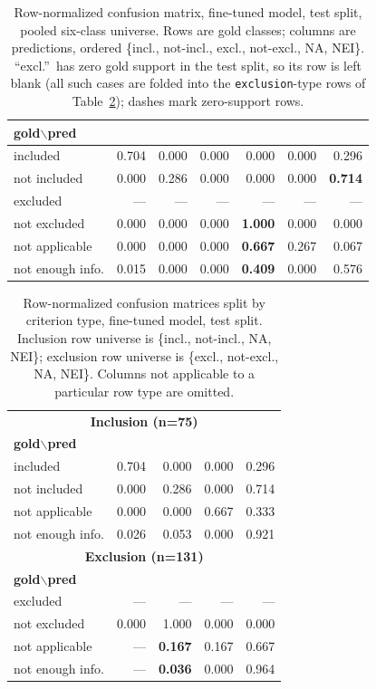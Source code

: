 \documentclass[conference]{IEEEtran}
\newcommand{\code}[1]{\texttt{\small #1}}
\newcommand{\rot}[1]{\rotatebox{60}{\footnotesize #1}}
\begin{document}
\begin{table}[t]
\caption{Row-normalized confusion matrix, fine-tuned model, test
split, pooled six-class universe. Rows are gold classes; columns
are predictions, ordered \{incl., not-incl., excl., not-excl.,
NA, NEI\}. ``excl.''\ has zero gold support in the test split, so
its row is left blank (all such cases are folded into the
\code{exclusion}-type rows of Table~\ref{tab:cmby}); dashes mark
zero-support rows.}
\label{tab:cmoverall}
\centering
\scriptsize
\setlength{\tabcolsep}{4pt}
\begin{tabular}{lrrrrrr}
\toprule
\textbf{gold$\backslash$pred} & \rot{incl.} & \rot{not-incl.} &
\rot{excl.} & \rot{not-excl.} & \rot{NA} & \rot{NEI}\\
\midrule
included & 0.704 & 0.000 & 0.000 & 0.000 & 0.000 & 0.296\\
not included & 0.000 & 0.286 & 0.000 & 0.000 & 0.000 & \textbf{0.714}\\
excluded & --- & --- & --- & --- & --- & ---\\
not excluded & 0.000 & 0.000 & 0.000 & \textbf{1.000} & 0.000 & 0.000\\
not applicable & 0.000 & 0.000 & 0.000 & \textbf{0.667} & 0.267 & 0.067\\
not enough info. & 0.015 & 0.000 & 0.000 & \textbf{0.409} & 0.000 & 0.576\\
\bottomrule
\end{tabular}
\end{table}

\begin{table}[t]
\caption{Row-normalized confusion matrices split by criterion type,
fine-tuned model, test split. Inclusion row universe is
\{incl., not-incl., NA, NEI\}; exclusion row universe is
\{excl., not-excl., NA, NEI\}. Columns not applicable to a
particular row type are omitted.}
\label{tab:cmby}
\centering
\scriptsize
\setlength{\tabcolsep}{4pt}
\begin{tabular}{lrrrr}
\toprule
\multicolumn{5}{c}{\textbf{Inclusion (n=75)}}\\
\textbf{gold$\backslash$pred} & \rot{incl.} & \rot{not-incl.} &
\rot{NA} & \rot{NEI}\\
\midrule
included & 0.704 & 0.000 & 0.000 & 0.296\\
not included & 0.000 & 0.286 & 0.000 & 0.714\\
not applicable & 0.000 & 0.000 & 0.667 & 0.333\\
not enough info. & 0.026 & 0.053 & 0.000 & 0.921\\
\midrule
\multicolumn{5}{c}{\textbf{Exclusion (n=131)}}\\
\textbf{gold$\backslash$pred} & \rot{excl.} & \rot{not-excl.} &
\rot{NA} & \rot{NEI}\\
\midrule
excluded & --- & --- & --- & ---\\
not excluded & 0.000 & 1.000 & 0.000 & 0.000\\
not applicable & --- & \textbf{0.167} & 0.167 & 0.667\\
not enough info. & --- & \textbf{0.036} & 0.000 & 0.964\\
\bottomrule
\end{tabular}
\end{table}
\end{document}

